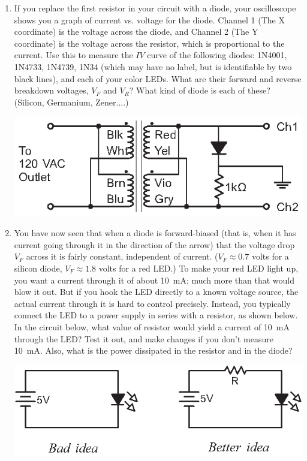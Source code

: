 \begin{enumerate}[wide]
\item If you replace the first resistor in your circuit with a diode, your oscilloscope shows you a graph of current vs. voltage for the diode.  Channel 1 (The X coordinate) is the voltage across the diode, and Channel 2 (The Y coordinate) is the voltage across the resistor, which is proportional to the current.  Use this to measure the $IV$ curve of the following diodes: 1N4001, 1N4733, 1N4739, 1N34 (which may have no label, but is identifiable by two black lines), and each of your color LEDs.  What are their forward and reverse breakdown voltages, $V_F$ and  $V_R$?  What kind of diode is each of these?  (Silicon, Germanium, Zener....) \label{part_measuring_diode_iv} \label{part_diode_measurements}
\vspace{-0.1in}
\begin{center}
\includegraphics{diodes/diode_testing_circuit_2.eps}
\end{center}

\item You have now seen that when a diode is forward-biased (that is, when it has current going through it in the direction of the arrow) that the voltage drop $V_F$ across it is fairly constant, independent of current.  ($V_F \approx 0.7$ volts for a silicon diode, $V_F \approx 1.8$ volts for a red LED.)  To make your red LED light up, you want a current through it of about 10~mA; much more than that would blow it out.  But if you hook the LED directly to a known voltage source, the actual current through it is hard to control precisely.  Instead, you typically connect the LED to a power supply in series with a resistor, as shown below.  In the circuit below, what value of resistor would yield a current of 10~mA through the LED?  Test it out, and make changes if you don't measure 10~mA.  Also, what is the power dissipated in the resistor and in the diode?
\vspace{-0.1in}
\begin{center}
\includegraphics{diodes/led_with_resistor.eps}
\end{center}


\end{enumerate}

